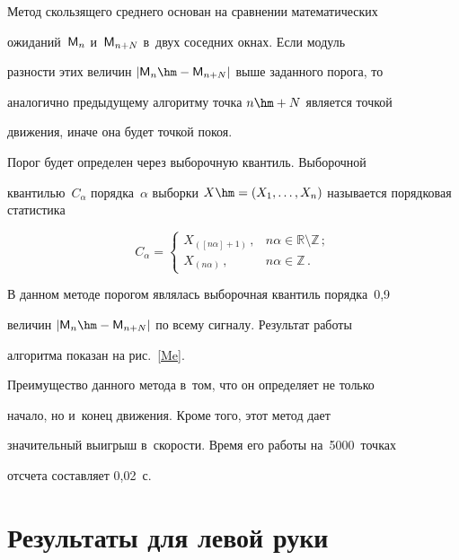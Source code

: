Метод скользящего среднего основан на сравнении математических

ожиданий~${\sf M}_n$ и~${\sf M}_{n+N}$ в~двух соседних окнах. Если модуль

разности этих величин $|{\sf M}_{n}\hm-{\sf M}_{n+N}|$ выше заданного порога, то

аналогично предыдущему алгоритму точка $n\hm+N$ является точкой

движения, иначе она будет точкой покоя.



Порог будет определен через выбороч\-ную квантиль. Выборочной

кван\-тилью~$C_\alpha$ порядка~$\alpha$  выборки $X \hm= (X_1, \ldots ,

X_n)$ называется порядковая статистика

$$

 C_\alpha = \begin{cases} 

 X_{([n\alpha]+1)}\,, & n\alpha \in \mathbb{R}\setminus \mathbb{Z}\,;

\\ 

X_{(n\alpha)}\,, & n\alpha \in \mathbb{Z}\,. 

\end{cases}

$$



В данном методе порогом являлась выборочная квантиль порядка~0,9

величин $|{\sf M}_{n}\hm-{\sf M}_{n+N}|$ по всему сигналу. Результат работы

алгоритма показан на рис.~\ref{Me}.







Преимущество данного метода в~том, что он определяет не только

начало, но и~конец движения. Кроме того, этот метод дает

значительный выигрыш в~скорости. Время его работы на~5000~точках

отсчета составляет 0,02~с.



\section{Результаты для левой руки}



